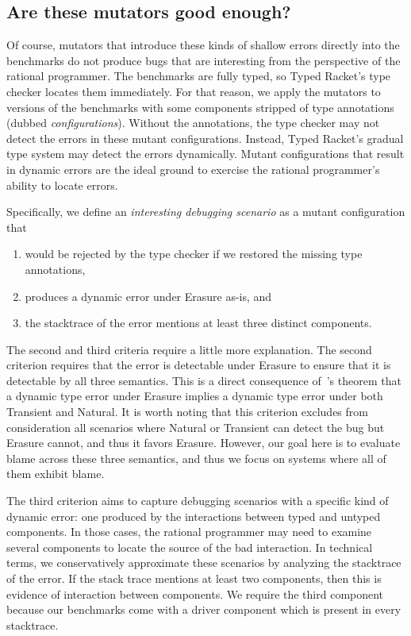 \subsection{Are these mutators good enough?}

Of course, mutators that introduce these kinds of shallow errors directly into the benchmarks do not produce bugs that are interesting from the perspective of the rational programmer.
The benchmarks are fully typed, so Typed Racket's type checker locates them immediately.
For that reason, we apply the mutators to versions of the benchmarks with some components stripped of type annotations (dubbed \emph{configurations}).
Without the annotations, the type checker may not detect the errors in these mutant configurations.
Instead, Typed Racket's gradual type system may detect the errors dynamically.
Mutant configurations that result in dynamic errors are the ideal ground to exercise the rational programmer's ability to locate errors.

Specifically, we define an \emph{interesting debugging scenario} as a mutant configuration that
\begin{enumerate}
\item would be rejected by the type checker if we restored the missing type annotations,
\item produces a dynamic error under Erasure as-is, and
\item the stacktrace of the error mentions at least three distinct components.
\end{enumerate}

The second and third criteria require a little more explanation.
The second criterion requires that the error is detectable under Erasure to ensure that it is detectable by all three semantics.
This is a direct consequence of~\citet{gfd-oopsla-2019}'s theorem that a dynamic type error under Erasure implies a dynamic type error under both Transient and Natural.
It is worth noting that this criterion excludes from consideration all scenarios where Natural or Transient can detect the bug but Erasure cannot, and thus it favors Erasure.
However, our goal here is to evaluate blame across these three semantics, and thus we focus on systems where all of them exhibit blame.


The third criterion aims to capture debugging scenarios with a specific kind of dynamic error: one produced by the interactions between typed and untyped components.
In those cases, the rational programmer may need to examine several components to locate the source of the bad interaction.
In technical terms, we conservatively approximate these scenarios by analyzing the stacktrace of the error.
If the stack trace mentions at least two components, then this is evidence of interaction between components.
We require the third component because our benchmarks come with a driver component which is present in every stacktrace.


